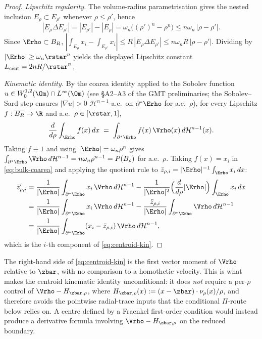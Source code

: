 \begin{proof}
\emph{Lipschitz regularity.} The volume-radius parametrisation gives
the nested inclusion $E_{\rho}\subset E_{\rho'}$ whenever
$\rho\le\rho'$, hence
\[
   |E_{\rho}\Delta E_{\rho'}|
   = |E_{\rho'}|-|E_{\rho}|
   = \omega_{n}\bigl((\rho')^{n}-\rho^{n}\bigr)
   \le n\omega_{n}\,|\rho-\rho'|.
\]
Since $\Erho\subset B_{R}$, $|\int_{E_{\rho}}x_{i}-\int_{E_{\rho'}}x_{i}|
\le R\,|E_{\rho}\Delta E_{\rho'}|\le n\omega_{n}R\,|\rho-\rho'|$.
Dividing by $|\Erho|\ge\omega_{n}\rstar^{n}$ yields the displayed
Lipschitz constant $L_{\mathrm{cent}}=2nR/\rstar^{n}$.

\emph{Kinematic identity.} By the coarea identity applied to the
Sobolev function $u\in W^{1,2}_{0}(\Om)\cap L^{\infty}(\Om)$ (see
§A2--A3 of the GMT preliminaries; the Sobolev--Sard step
\cite{FigalliMaggi2011} ensures $|\nabla u|>0$
$\mathcal H^{n-1}$-a.e.\ on $\partial^{*}\Erho$ for a.e.\ $\rho$),
for every Lipschitz $f:\overline{B_{R}}\to\R$ and a.e.\
$\rho\in[\rstar,1]$,
\begin{equation}\label{eq:bulk-coarea}
   \frac{d}{d\rho}\int_{\Erho}f(x)\,dx
   \;=\;
   \int_{\partial^{*}\Erho} f(x)\,\Vrho(x)\,d\mathcal H^{n-1}(x).
\end{equation}
Taking $f\equiv 1$ and using $|\Erho|=\omega_{n}\rho^{n}$ gives
$\int_{\partial^{*}\Erho}\Vrho\,d\mathcal H^{n-1}=n\omega_{n}\rho^{n-1}
=P(B_{\rho})$ for a.e.\ $\rho$. Taking $f(x)=x_{i}$ in
\eqref{eq:bulk-coarea} and applying the quotient rule to
$\bar z_{\rho,i}=|\Erho|^{-1}\int_{\Erho}x_{i}\,dx$:
\begin{align*}
   \bar z_{\rho,i}^{\prime}
   &= \frac{1}{|\Erho|}\int_{\partial^{*}\Erho}x_{i}\,\Vrho\,d\mathcal H^{n-1}
   -\frac{1}{|\Erho|^{2}}
   \Bigl(\frac{d}{d\rho}|\Erho|\Bigr)\int_{\Erho}x_{i}\,dx \\
   &= \frac{1}{|\Erho|}\int_{\partial^{*}\Erho}x_{i}\,\Vrho\,d\mathcal H^{n-1}
   -\frac{\bar z_{\rho,i}}{|\Erho|}\int_{\partial^{*}\Erho}\Vrho\,d\mathcal H^{n-1}\\
   &= \frac{1}{|\Erho|}\int_{\partial^{*}\Erho}(x_{i}-\bar z_{\rho,i})\,\Vrho\,d\mathcal H^{n-1},
\end{align*}
which is the $i$-th component of \eqref{eq:centroid-kin}.
\end{proof}

\begin{remark}\label{rmk:no-homothety}
The right-hand side of \eqref{eq:centroid-kin} is the first vector
moment of $\Vrho$ relative to $\zbar$, with no comparison to a
homothetic velocity. This is what makes the centroid kinematic
identity unconditional: it does \emph{not} require a per-$\rho$
control of $\Vrho-H_{\zbar,\rho}$, where
$H_{\zbar,\rho}(x):=(x-\zbar)\cdot\nu_{\rho}(x)/\rho$, and therefore
avoids the pointwise radial-trace inputs that the conditional
$\Pi$-route below relies on. A centre defined by a Fraenkel
first-order condition would instead produce a derivative formula
involving $\Vrho-H_{\zbar,\rho}$ on the reduced boundary.
\end{remark}

